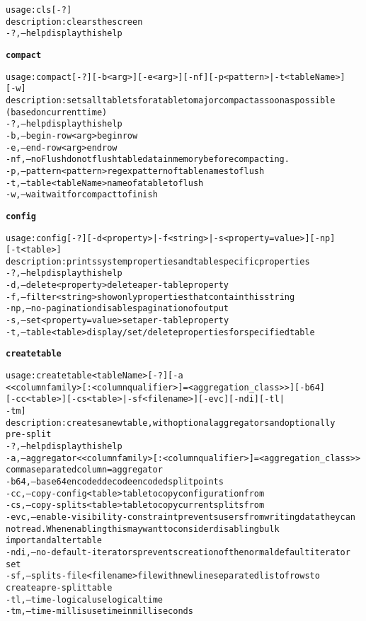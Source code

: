 \begin{alltt}
    usage: cls [-?]
    description: clears the screen
      -?,--help  display this help

\textbf{compact}

    usage: compact [-?] [-b <arg>] [-e <arg>] [-nf] [-p <pattern> | -t <tableName>] 
    	      [-w]
    description: sets all tablets for a table to major compact as soon as possible
    	      (based on current time)
      -?,--help  display this help
      -b,--begin-row <arg>	begin row
      -e,--end-row <arg>  end row
      -nf,--noFlush  do not flush table data in memory before compacting.
      -p,--pattern <pattern>  regex pattern of table names to flush
      -t,--table <tableName>  name of a table to flush
      -w,--wait  wait for compact to finish

\textbf{config}

    usage: config [-?] [-d <property> | -f <string> | -s <property=value>]	[-np] 
    	      [-t <table>]
    description: prints system properties and table specific properties
      -?,--help  display this help
      -d,--delete <property>  delete a per-table property
      -f,--filter <string>	show only properties that contain this string
      -np,--no-pagination  disables pagination of output
      -s,--set <property=value>  set a per-table property
      -t,--table <table>  display/set/delete properties for specified table

\textbf{createtable}

    usage: createtable <tableName> [-?] [-a
    	      <{<columnfamily>[:<columnqualifier>]=<aggregation\_class>}>] [-b64]
    	      [-cc <table>] [-cs <table> | -sf <filename>] [-evc] [-ndi]  [-tl |
    	      -tm]
    description: creates a new table, with optional aggregators and optionally
    	      pre-split
      -?,--help  display this help
      -a,--aggregator <{<columnfamily>[:<columnqualifier>]=<aggregation\_class>}> 
    	      comma separated column=aggregator
      -b64,--base64encoded	decode encoded split points
      -cc,--copy-config <table>  table to copy configuration from
      -cs,--copy-splits <table>  table to copy current splits from
      -evc,--enable-visibility-constraint  prevents users from writing data they can
    	      not read.  When enabling this may want to consider disabling bulk
    	      import and alter table
      -ndi,--no-default-iterators  prevents creation of the normal default iterator
    	      set
      -sf,--splits-file <filename>	file with newline separated list of rows to
    	      create a pre-split table
      -tl,--time-logical  use logical time
      -tm,--time-millis  use time in milliseconds


\end{alltt}
